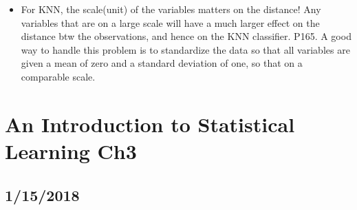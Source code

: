 \documentclass[a4paper, 12pt]{article}
\begin{document}
\begin{itemize}
	\item For KNN, the scale(unit) of the variables matters on the distance! Any variables that are on a large scale will have a much larger effect on the distance btw the observations, and hence on the KNN classifier. P165. A good way to handle this problem is to standardize the data so that all variables are given a mean of zero and a standard deviation of one, so that on a comparable scale.
	
\end{itemize}


\section*{An Introduction to Statistical Learning Ch3}
\subsection{1/15/2018}
\end{document}
